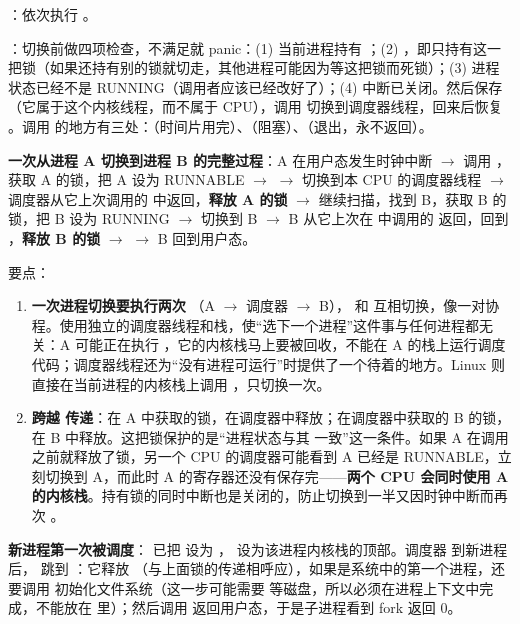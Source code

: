 \textbf{}：依次执行    。

\textbf{}：切换前做四项检查，不满足就 panic：(1) 当前进程持有 ；(2) ，即只持有这一把锁（如果还持有别的锁就切走，其他进程可能因为等这把锁而死锁）；(3) 进程状态已经不是 RUNNING（调用者应该已经改好了）；(4) 中断已关闭。然后保存 （它属于这个内核线程，而不属于 CPU），调用  切换到调度器线程，回来后恢复 。调用  的地方有三处：（时间片用完）、（阻塞）、（退出，永不返回）。

\textbf{一次从进程 A 切换到进程 B 的完整过程}：A 在用户态发生时钟中断 $\to$  调用 ，获取 A 的锁，把 A 设为 RUNNABLE $\to$  $\to$  切换到本 CPU 的调度器线程 $\to$ 调度器从它上次调用的  中返回，\textbf{释放 A 的锁} $\to$ 继续扫描，找到 B，获取 B 的锁，把 B 设为 RUNNING $\to$  切换到 B $\to$ B 从它上次在  中调用的  返回，回到 ，\textbf{释放 B 的锁} $\to$  $\to$ B 回到用户态。

要点：
\begin{enumerate}
    \item \textbf{一次进程切换要执行两次 }（A $\to$ 调度器 $\to$ B）， 和  互相切换，像一对协程。使用独立的调度器线程和栈，使“选下一个进程”这件事与任何进程都无关：A 可能正在执行 ，它的内核栈马上要被回收，不能在 A 的栈上运行调度代码；调度器线程还为“没有进程可运行”时提供了一个待着的地方。Linux 则直接在当前进程的内核栈上调用 ，只切换一次。
    \item {} \textbf{跨越  传递}：在 A 中获取的锁，在调度器中释放；在调度器中获取的 B 的锁，在 B 中释放。这把锁保护的是“进程状态与其  一致”这一条件。如果 A 在调用  之前就释放了锁，另一个 CPU 的调度器可能看到 A 已经是 RUNNABLE，立刻切换到 A，而此时 A 的寄存器还没有保存完——\textbf{两个 CPU 会同时使用 A 的内核栈}。持有锁的同时中断也是关闭的，防止切换到一半又因时钟中断而再次 。
\end{enumerate}

\textbf{新进程第一次被调度}： 已把  设为 ， 设为该进程内核栈的顶部。调度器  到新进程后， 跳到 ：它释放 （与上面锁的传递相呼应），如果是系统中的第一个进程，还要调用  初始化文件系统（这一步可能需要  等磁盘，所以必须在进程上下文中完成，不能放在  里）；然后调用  返回用户态，于是子进程看到 fork 返回 0。

